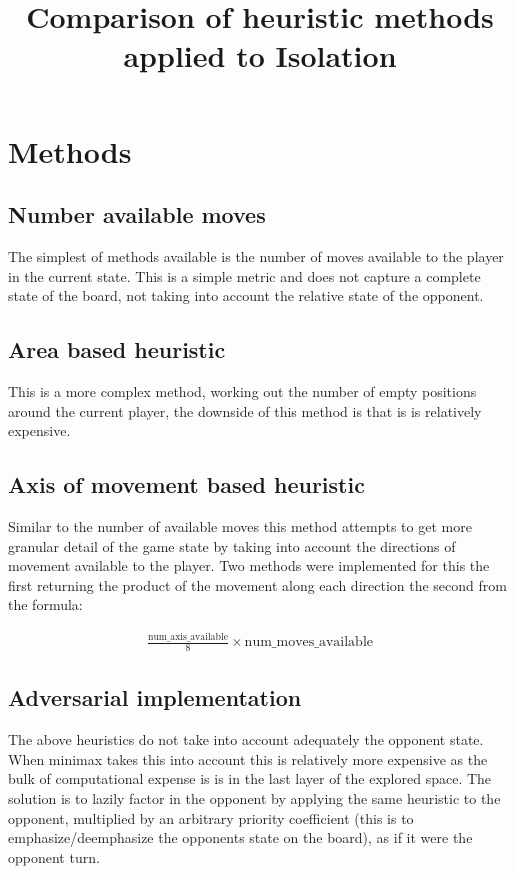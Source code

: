 \documentclass[11pt]{article}
\title{\textbf{Comparison of heuristic methods applied to Isolation}}
\begin{document}
\maketitle

\newpage


\section{Methods}
\subsection{Number available moves}
The simplest of methods available is the number of moves available to the player in the current state.
This is a simple metric and does not capture a complete state of the board, not taking into account the relative state of the opponent.

\subsection{Area based heuristic}
This is a more complex method, working out the number of empty positions around the current player, the downside of this method is that is is relatively expensive.


\subsection{Axis of movement based heuristic}
Similar to the number of available moves this method attempts to get more granular detail of the game state by taking into account the directions of movement available to the player. Two methods were implemented for this the first returning the product of the movement along each direction the second from the formula: 

\begin{align}
	\frac{\textrm{num\_axis\_available}}{8} \times \textrm{num\_moves\_available}
	\label{num_moves_available}
\end{align}%


\subsection{Adversarial implementation}
The above heuristics do not take into account adequately the opponent state. When minimax takes this into account this is relatively more expensive as the bulk of computational expense is is in the last layer of the explored space. The solution is to lazily factor in the opponent by applying the same heuristic to the opponent, multiplied by an arbitrary priority coefficient (this is to emphasize/deemphasize the opponents state on the board), as if it were the opponent turn.
\end{document}
